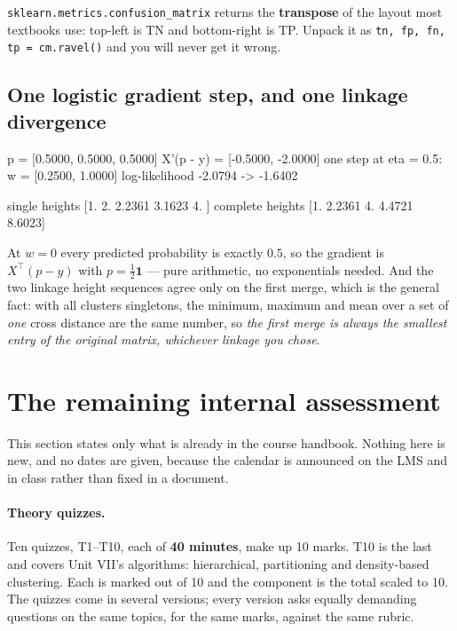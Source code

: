 \documentclass[11pt]{article}
\begin{document}
\begin{caution}
\texttt{sklearn.metrics.confusion\_matrix} returns the \textbf{transpose} of
the layout most textbooks use: top-left is TN and bottom-right is TP. Unpack
it as \texttt{tn, fp, fn, tp = cm.ravel()} and you will never get it wrong.
\end{caution}

\subsection{One logistic gradient step, and one linkage divergence}

\begin{codeout}
p = [0.5000, 0.5000, 0.5000]   X'(p - y) = [-0.5000, -2.0000]
one step at eta = 0.5: w = [0.2500, 1.0000]
log-likelihood -2.0794 -> -1.6402

single    heights [1.     2.     2.2361 3.1623 4.    ]
complete  heights [1.     2.2361 4.     4.4721 8.6023]
\end{codeout}

At $w = 0$ every predicted probability is exactly $0.5$, so the gradient is
$X^\top(p - y)$ with $p = \tfrac12 \mathbf{1}$ --- pure arithmetic, no
exponentials needed. And the two linkage height sequences agree only on the
first merge, which is the general fact: with all clusters singletons, the
minimum, maximum and mean over a set of \emph{one} cross distance are the
same number, so \emph{the first merge is always the smallest entry of the
original matrix, whichever linkage you chose}.

\section{The remaining internal assessment}
\label{sec:assess}

This section states only what is already in the course handbook. Nothing here
is new, and no dates are given, because the calendar is announced on the LMS
and in class rather than fixed in a document.

\paragraph{Theory quizzes.} Ten quizzes, T1--T10, each of \textbf{40 minutes},
make up 10 marks. T10 is the last and covers Unit VII's algorithms:
hierarchical, partitioning and density-based clustering. Each is marked out of
10 and the component is the total scaled to 10. The quizzes come in several
versions; every version asks equally demanding questions on the same topics,
for the same marks, against the same rubric.
\end{document}
